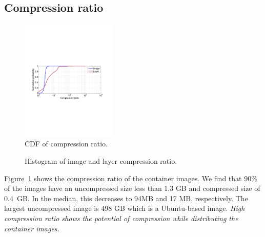 \subsection{Compression ratio}
\begin{figure}
	\centering
	\includegraphics[width=0.4\textwidth]{graphs/compress-ratio-cdf.pdf}
	\caption{CDF of compression ratio.
	}
	\label{fig:compress-ratio}
\end{figure}

\begin{figure}[!t]
	\centering
	\caption{Histogram of image and layer compression ratio.}
	\label{fig:reference-cnt}
\end{figure}

Figure~\ref{fig:compress-ratio} shows the compression ratio of the container
images.  We find that 90\% of the images have an uncompressed size less than
1.3 GB and compressed size of 0.4~GB.
In the median, this decreases to 94MB and 17 MB, respectively.  The largest
uncompressed image is 498 GB which is a Ubuntu-based image.  \emph{High compression
ratio shows the potential of compression while distributing the container
images.  }

